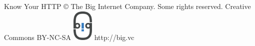 \usepackage{cclicenses}

\beamertemplatenavigationsymbolsempty

{%
\begin{beamercolorbox}{}
  \hspace{8pt} Know Your HTTP  \copyright \hspace{0in} The Big Internet Company. Some rights reserved. \cc \hspace{-0.1in} Creative Commons BY-NC-SA \hfill \Huge \includegraphics[width=28pt]{./logo.pdf} \hspace{10pt}http://big.vc
  \vspace{8pt}
\end{beamercolorbox}%
}
